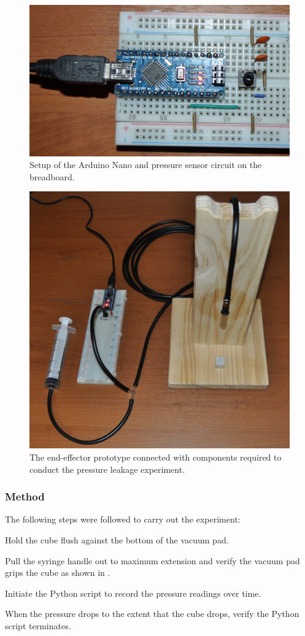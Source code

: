 \begin{figure}[!ht]
    \centering
    \includegraphics[width=0.6\linewidth]{figures/202105/end-effector-circuit-setup.jpg}
    \caption{Setup of the Arduino Nano and pressure sensor circuit on the breadboard.}
    \label{fig:end-effector-circuit-setup}
\end{figure}

\begin{figure}[!ht]
    \centering
    \includegraphics[width=0.6\linewidth]{figures/202105/end-effector-experimental-setup.jpg}
    \caption{The end-effector prototype connected with components required to conduct the pressure leakage experiment.}
    \label{fig:end-effector-experimental-setup}
\end{figure}

\subsubsection{Method}

The following steps were followed to carry out the experiment:

\begin{compactenum}
    \item Hold the cube flush against the bottom of the vacuum pad.
    \item Pull the syringe handle out to maximum extension and verify the vacuum pad grips the cube as shown in .
    \item Initiate the Python script to record the pressure readings over time.
    \item When the pressure drops to the extent that the cube drops, verify the Python script terminates.
\end{compactenum}

